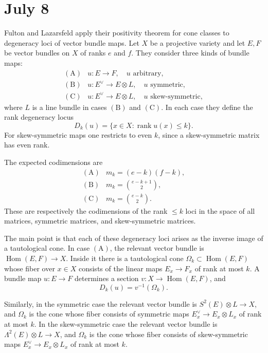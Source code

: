 \documentclass[12pt]{article}
\begin{document}
\section{July 8}

Fulton and Lazarsfeld apply their positivity theorem for cone classes to degeneracy loci of vector bundle maps. Let $X$ be a projective variety and let $E,F$ be vector bundles on $X$ of ranks $e$ and $f$. They consider three kinds of bundle maps:
$$
\begin{array}{ll}
\mathrm{(A)} & u:E\to F, \quad u \text{ arbitrary},\\[2mm]
\mathrm{(B)} & u:E^\vee\to E\otimes L, \quad u \text{ symmetric},\\[2mm]
\mathrm{(C)} & u:E^\vee\to E\otimes L, \quad u \text{ skew-symmetric},
\end{array}
$$
where $L$ is a line bundle in cases $\mathrm{(B)}$ and $\mathrm{(C)}$. In each case they define the rank degeneracy locus
$$D_k(u)=\{x\in X:\operatorname{rank}u(x)\le k\}.$$
For skew-symmetric maps one restricts to even $k$, since a skew-symmetric matrix has even rank.

The expected codimensions are
$$
\begin{array}{ll}
\mathrm{(A)} & m_k=(e-k)(f-k),\\[2mm]
\mathrm{(B)} & m_k=\binom{e-k+1}{2},\\[2mm]
\mathrm{(C)} & m_k=\binom{e-k}{2}.
\end{array}
$$
These are respectively the codimensions of the rank $\le k$ loci in the space of all matrices, symmetric matrices, and skew-symmetric matrices.

The main point is that each of these degeneracy loci arises as the inverse image of a tautological cone. In case $\mathrm{(A)}$, the relevant vector bundle is $\operatorname{Hom}(E,F)\to X$. Inside it there is a tautological cone $\Omega_k\subset \operatorname{Hom}(E,F)$ whose fiber over $x\in X$ consists of the linear maps $E_x\to F_x$ of rank at most $k$. A bundle map $u:E\to F$ determines a section $v:X\to \operatorname{Hom}(E,F)$, and
$$D_k(u)=v^{-1}(\Omega_k).$$

Similarly, in the symmetric case the relevant vector bundle is $S^2(E)\otimes L\to X$, and $\Omega_k$ is the cone whose fiber consists of symmetric maps $E_x^\vee\to E_x\otimes L_x$ of rank at most $k$. In the skew-symmetric case the relevant vector bundle is $\Lambda^2(E)\otimes L\to X$, and $\Omega_k$ is the cone whose fiber consists of skew-symmetric maps $E_x^\vee\to E_x\otimes L_x$ of rank at most $k$.
\end{document}
